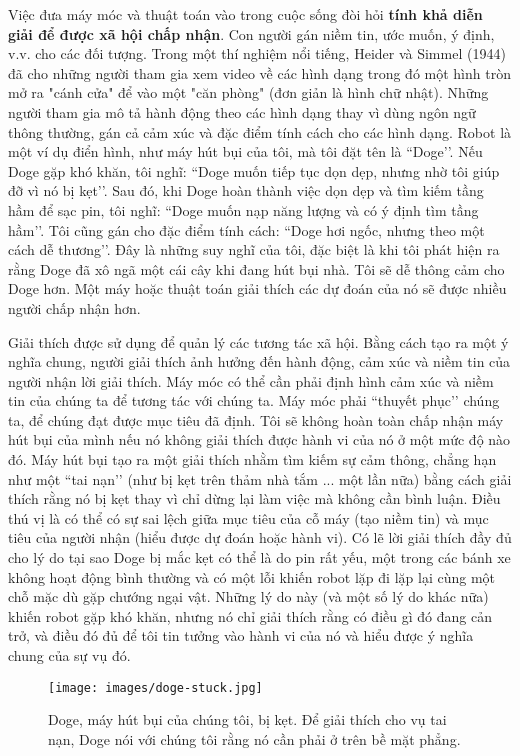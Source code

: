 Việc đưa máy móc và thuật toán vào trong cuộc sống đòi hỏi \textbf{tính khả diễn giải để được xã hội chấp nhận}.  Con người gán niềm tin, ước muốn, ý định, v.v. cho các đối tượng. Trong một thí nghiệm nổi tiếng, Heider và Simmel (1944) đã cho những người tham gia xem video về các hình dạng trong đó một hình tròn mở ra "cánh cửa" để vào một "căn phòng" (đơn giản là hình chữ nhật). Những người tham gia mô tả hành động theo các hình dạng thay vì dùng ngôn ngữ thông thường, gán cả cảm xúc và đặc điểm tính cách cho các hình dạng. Robot là một ví dụ điển hình, như máy hút bụi của tôi, mà tôi đặt tên là ``Doge’’. Nếu Doge gặp khó khăn, tôi nghĩ: ``Doge muốn tiếp tục dọn dẹp, nhưng nhờ tôi giúp đỡ vì nó bị kẹt’’. Sau đó, khi Doge hoàn thành việc dọn dẹp và tìm kiếm tầng hầm để sạc pin, tôi nghĩ: ``Doge muốn nạp năng lượng và có ý định tìm tầng hầm’’. Tôi cũng gán cho đặc điểm tính cách: ``Doge hơi ngốc, nhưng theo một cách dễ thương’’. Đây là những suy nghĩ của tôi, đặc biệt là khi tôi phát hiện ra rằng Doge đã xô ngã một cái cây khi đang hút bụi nhà. Tôi sẽ dễ thông cảm cho Doge hơn. Một máy hoặc thuật toán giải thích các dự đoán của nó sẽ được nhiều người chấp nhận hơn. 

Giải thích được sử dụng để quản lý các tương tác xã hội. Bằng cách tạo ra một ý nghĩa chung, người giải thích ảnh hưởng đến hành động, cảm xúc và niềm tin của người nhận lời giải thích. Máy móc có thể cần phải định hình cảm xúc và niềm tin của chúng ta để tương tác với chúng ta. Máy móc phải ``thuyết phục’’ chúng ta, để chúng đạt được mục tiêu đã định. Tôi sẽ không hoàn toàn chấp nhận máy hút bụi của mình nếu nó không giải thích được hành vi của nó ở một mức độ nào đó. Máy hút bụi tạo ra một giải thích nhằm tìm kiếm sự cảm thông, chẳng hạn như một ``tai nạn’’ (như bị kẹt trên thảm nhà tắm ... một lần nữa) bằng cách giải thích rằng nó bị kẹt thay vì chỉ dừng lại làm việc mà không cần bình luận. Điều thú vị là có thể có sự sai lệch giữa mục tiêu của cỗ máy (tạo niềm tin) và mục tiêu của người nhận (hiểu được dự đoán hoặc hành vi). Có lẽ lời giải thích đầy đủ cho lý do tại sao Doge bị mắc kẹt có thể là do pin rất yếu, một trong các bánh xe không hoạt động bình thường và có một lỗi khiến robot lặp đi lặp lại cùng một chỗ mặc dù gặp chướng ngại vật. Những lý do này (và một số lý do khác nữa) khiến robot gặp khó khăn, nhưng nó chỉ giải thích rằng có điều gì đó đang cản trở, và điều đó đủ để tôi tin tưởng vào hành vi của nó và hiểu được ý nghĩa chung của sự vụ đó. 


\begin{figure*}[h!]
	\centering
	\texttt{[image: images/doge-stuck.jpg]}
	\caption{Doge, máy hút bụi của chúng tôi, bị kẹt. Để giải thích cho vụ tai nạn, Doge nói với chúng tôi rằng nó cần phải ở trên bề mặt phẳng.}
\end{figure*}



